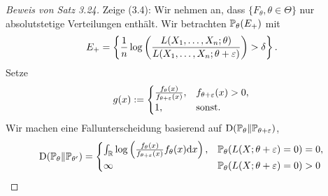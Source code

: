 \begin{proof}[Beweis von Satz 3.24]
  Zeige (3.4): Wir nehmen an, dass $\{ F_\theta, \theta \in \Theta \}$ nur
  absolutstetige Verteilungen enthält. Wir betrachten $\mathbb{P}_\theta(E_+)$ mit
  \[ E_+ = \left\{
      \frac{1}{n} \log \left(
        \frac{L(X_1, \ldots, X_n; \theta)}{L(X_1, \ldots, X_n; \theta + \varepsilon)} 
      \right) > \delta
    \right\}. \]
  Setze
  \[ g(x) := \begin{cases}
      \frac{f_\theta(x)}{f_{\theta + \varepsilon}(x)}, &f_{\theta + \varepsilon}(x) > 0, \\
      1, &\text{sonst.}
    \end{cases}
  \]
  Wir machen eine Fallunterscheidung basierend auf $\operatorname*{D}( \mathbb{P}_\theta \|
  \mathbb{P}_{\theta + \varepsilon})$,
    \[ \operatorname*{D}( \mathbb{P}_\theta \| \mathbb{P}_{\theta'} ) =
    \begin{cases}
      \int_{\mathbb{R}} \log \left( \frac{f_\theta(x)}{f_{\theta + \varepsilon}(x)} f_\theta(x)
        \mathrm{d} x \right), &\mathbb{P}_\theta( L(X; \theta + \varepsilon) = 0 ) = 0, \\
      \infty & \mathbb{P}_\theta( L(X; \theta + \varepsilon) = 0 ) > 0
    \end{cases}
  \]


\end{proof}
